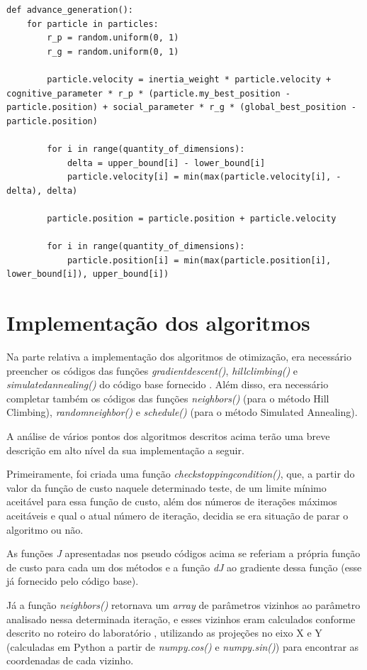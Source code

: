 \documentclass[conference]{IEEEtran}
\begin{document}
\begin{lstlisting}
def advance_generation():
	for particle in particles:
		r_p = random.uniform(0, 1)
		r_g = random.uniform(0, 1)

		particle.velocity = inertia_weight * particle.velocity + cognitive_parameter * r_p * (particle.my_best_position - particle.position) + social_parameter * r_g * (global_best_position - particle.position)

		for i in range(quantity_of_dimensions):
			delta = upper_bound[i] - lower_bound[i]
    		particle.velocity[i] = min(max(particle.velocity[i], -delta), delta)
		
		particle.position = particle.position + particle.velocity

		for i in range(quantity_of_dimensions):
    		particle.position[i] = min(max(particle.position[i], lower_bound[i]), upper_bound[i])
\end{lstlisting}

\section{Implementação dos algoritmos}
Na parte relativa a implementação dos algoritmos de otimização, era necessário preencher os códigos das funções \textit{gradient\underline{\space}descent()}, \textit{hill\underline{\space}climbing()} e \textit{simulated\underline{\space}annealing()} do código base fornecido \cite{b1}.  Além disso, era necessário completar também os códigos das funções \textit{neighbors()} (para o método Hill Climbing), \textit{random\underline{\space}neighbor()} e \textit{schedule()} (para o método Simulated Annealing). 

A análise de vários pontos dos algoritmos descritos acima terão uma breve descrição em alto nível da sua implementação a seguir. 

Primeiramente, foi criada uma função \textit{check\underline{\space}stopping\underline{\space}condition()}, que, a partir do valor da função de custo naquele determinado teste, de um limite mínimo aceitável para essa função de custo, além dos números de iterações máximos aceitáveis e qual o atual número de iteração, decidia se era situação de parar o algoritmo ou não.

As funções \textit{J} apresentadas nos pseudo códigos acima se referiam a própria função de custo para cada um dos métodos e a função \textit{dJ} ao gradiente dessa função (esse já fornecido pelo código base).

Já a função \textit{neighbors()} retornava um \textit{array} de parâmetros vizinhos ao parâmetro analisado nessa determinada iteração, e esses vizinhos eram calculados conforme descrito no roteiro do laboratório \cite{b1}, utilizando as projeções no eixo X e Y (calculadas em Python a partir de \textit{numpy.cos()} e \textit{numpy.sin()}) para encontrar as coordenadas de cada vizinho.
\end{document}
